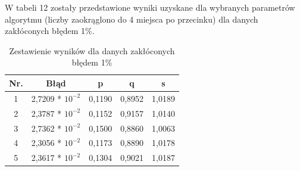 \documentclass[twoside]{projektInzynierskiMS1}
\newcounter{rowcnt}
\newcommand\rownum{\ifnumequal{\value{rowcnt}}{0}{\textbf{Nr.}}{\therowcnt.}\refstepcounter{rowcnt}}
\begin{document}




W tabeli 12 zostały przedstawione wyniki uzyskane dla wybranych parametrów algorytmu (liczby zaokrąglono do 4 miejsca po przecinku) dla danych zakłóconych błędem 1\%. \\

\begin{table}[htbp]\centering
\def\sym#1{\ifmmode^{#1}\else\(^{#1}\)\fi}
\caption{Zestawienie wyników dla danych zakłóconych błędem 1\%}
\renewcommand\arraystretch{1.333}
\begin{tabular}{|c|c|c|c|c|} 
                  \hline
\textbf{Nr.}& \textbf{Błąd} &\textbf{p} & \textbf{q} & \textbf{s}\\ \hline
1& 2,7209 * $10^{-2}$ & 0,1190 & 0,8952 & 1,0189 \\ \hline 
2& 2,3787 * $10^{-2}$ & 0,1152 & 0,9157 & 1,0140 \\ \hline 
3& 2,7362 * $10^{-2}$ & 0,1500 & 0,8860 & 1,0063 \\ \hline 
4& 2,3056 * $10^{-2}$ & 0,1173 & 0,8890 & 1,0178 \\ \hline 
5& 2,3617 * $10^{-2}$ & 0,1304 & 0,9021 & 1,0187 \\ \hline 
\end{tabular}
\end{table}
\end{document}
